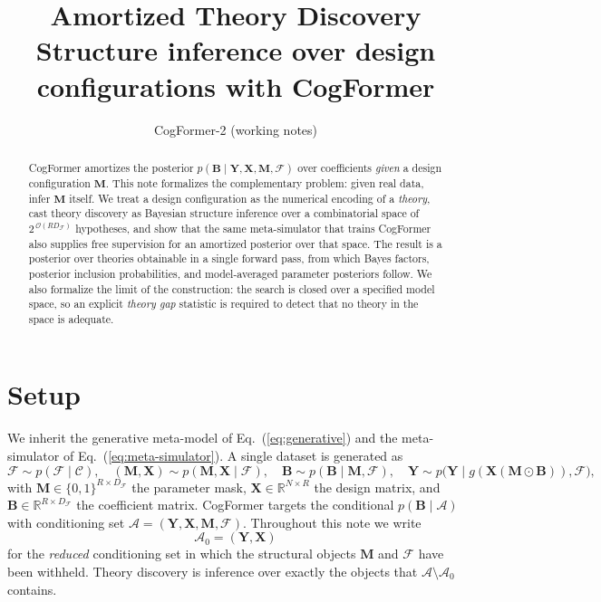 \documentclass[11pt]{article}
\title{Amortized Theory Discovery\\
\large Structure inference over design configurations with CogFormer}
\author{CogFormer-2 (working notes)}
\date{}
\newcommand{\rmB}{\mathbf{B}}
\newcommand{\rmX}{\mathbf{X}}
\newcommand{\rmM}{\mathbf{M}}
\newcommand{\rmY}{\mathbf{Y}}
\providecommand{\cref}[1]{Eq.~(\ref{#1})}
\begin{document}
\maketitle

\begin{abstract}
\noindent
CogFormer amortizes the posterior $p(\rmB \mid \rmY, \rmX, \rmM, \mathcal{F})$ over
coefficients \emph{given} a design configuration $\rmM$. This note formalizes the
complementary problem: given real data, infer $\rmM$ itself. We treat a design
configuration as the numerical encoding of a \emph{theory}, cast theory discovery as
Bayesian structure inference over a combinatorial space of $2^{\,\mathcal{O}(RD_\mathcal{F})}$
hypotheses, and show that the same meta-simulator that trains CogFormer also supplies
free supervision for an amortized posterior over that space. The result is a posterior
over theories obtainable in a single forward pass, from which Bayes factors, posterior
inclusion probabilities, and model-averaged parameter posteriors follow. We also
formalize the limit of the construction: the search is closed over a specified model
space, so an explicit \emph{theory gap} statistic is required to detect that no theory
in the space is adequate.
\end{abstract}

\section{Setup}

We inherit the generative meta-model of \cref{eq:generative} and the meta-simulator of
\cref{eq:meta-simulator}. A single dataset is generated as
%
\begin{equation}
\label{eq:td-generative}
\mathcal{F} \sim p(\mathcal{F} \mid \mathcal{C}),\quad
(\rmM, \rmX) \sim p(\rmM, \rmX \mid \mathcal{F}),\quad
\rmB \sim p(\rmB \mid \rmM, \mathcal{F}),\quad
\rmY \sim p\big(\rmY \mid g(\rmX(\rmM \odot \rmB)), \mathcal{F}\big),
\end{equation}
%
with $\rmM \in \{0,1\}^{R \times D_\mathcal{F}}$ the parameter mask, $\rmX \in \mathbb{R}^{N \times R}$
the design matrix, and $\rmB \in \mathbb{R}^{R \times D_\mathcal{F}}$ the coefficient matrix.
CogFormer targets the conditional $p(\rmB \mid \mathcal{A})$ with conditioning set
$\mathcal{A} = (\rmY, \rmX, \rmM, \mathcal{F})$. Throughout this note we write
%
\begin{equation}
\mathcal{A}_0 = (\rmY, \rmX)
\end{equation}
%
for the \emph{reduced} conditioning set in which the structural objects $\rmM$ and
$\mathcal{F}$ have been withheld. Theory discovery is inference over exactly the
objects that $\mathcal{A}\setminus\mathcal{A}_0$ contains.
\end{document}
